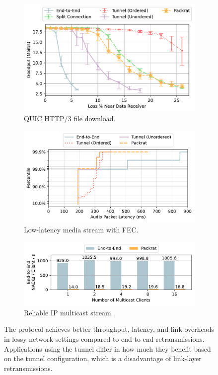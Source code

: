 \begin{figure}[t]
    \centering
    \begin{subfigure}[b]{0.9\linewidth}
        \includegraphics[width=\linewidth]{figures/http_benchmark.pdf}
        \caption{QUIC HTTP/3 file download.}
        \label{fig:perf:http}
    \end{subfigure}
    \begin{subfigure}[b]{\linewidth}
        \includegraphics[width=\linewidth]{figures/media_benchmark.pdf}
        \caption{Low-latency media stream with FEC.}
        \label{fig:perf:media}
    \end{subfigure}
    \begin{subfigure}[b]{\linewidth}
        \includegraphics[width=\linewidth]{figures/multicast_benchmark.pdf}
        \caption{Reliable IP multicast stream.}
        \label{fig:perf:multicast}
    \end{subfigure}
    \vspace{-0.3cm}
    \caption{The \Sys protocol achieves better throughput, latency, and link overheads in lossy network settings compared to end-to-end retransmissions. Applications using the tunnel differ in how much they benefit based on the tunnel configuration, which is a disadvantage of link-layer retransmissions.}
    \label{fig:perf}
\end{figure}